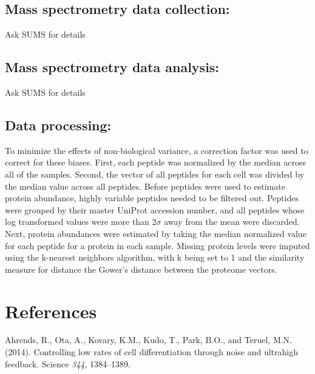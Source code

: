 \documentclass[11pt,]{article}
\begin{document}
\hypertarget{mass-spectrometry-data-collection}{%
\subsection{Mass spectrometry data
collection:}\label{mass-spectrometry-data-collection}}

Ask SUMS for details

\hypertarget{mass-spectrometry-data-analysis}{%
\subsection{Mass spectrometry data
analysis:}\label{mass-spectrometry-data-analysis}}

Ask SUMS for details

\hypertarget{data-processing}{%
\subsection{Data processing:}\label{data-processing}}

To minimize the effects of non-biological variance, a correction factor
was used to correct for these biases. First, each peptide was normalized
by the median across all of the samples. Second, the vector of all
peptides for each cell was divided by the median value across all
peptides. Before peptides were used to estimate protein abundance,
highly variable peptides needed to be filtered out. Peptides were
grouped by their master UniProt accession number, and all peptides whose
log transformed values were more than 2\(\sigma\) away from the mean
were discarded. Next, protein abundances were estimated by taking the
median normalized value for each peptide for a protein in each sample.
Missing protein levels were imputed using the k-nearest neighbors
algorithm, with k being set to 1 and the similarity measure for distance
the Gower's distance between the proteome vectors.

\clearpage

\hypertarget{references}{%
\section{References}\label{references}}

\hypertarget{refs}{}
\leavevmode\hypertarget{ref-ahrends2014controlling}{}%
Ahrends, R., Ota, A., Kovary, K.M., Kudo, T., Park, B.O., and Teruel,
M.N. (2014). Controlling low rates of cell differentiation through noise
and ultrahigh feedback. Science \emph{344}, 1384--1389.
\end{document}
